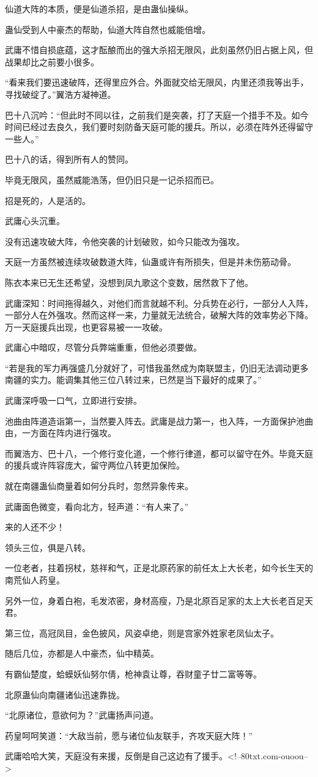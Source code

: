 \begin{this_body}
仙道大阵的本质，便是仙道杀招，是由蛊仙操纵。

蛊仙受到人中豪杰的帮助，仙道大阵自然也威能倍增。

武庸不惜自损底蕴，这才酝酿而出的强大杀招无限风，此刻虽然仍旧占据上风，但战果却比之前要小很多。

“看来我们要迅速破阵，还得里应外合。外面就交给无限风，内里还须我等出手，寻找破绽了。”翼浩方凝神道。

巴十八沉吟：“但此时不同以往，之前我们是突袭，打了天庭一个措手不及。如今时间已经过去良久，我们要时刻防备天庭可能的援兵。所以，必须在阵外还得留守一些人。”

巴十八的话，得到所有人的赞同。

毕竟无限风，虽然威能浩荡，但仍旧只是一记杀招而已。

招是死的，人是活的。

武庸心头沉重。

没有迅速攻破大阵，令他突袭的计划破败，如今只能改为强攻。

天庭一方虽然被连续攻破数道大阵，仙蛊或许有所损失，但是并未伤筋动骨。

陈衣本来已无生还希望，没想到凤九歌这个变数，居然救下了他。

武庸深知：时间拖得越久，对他们而言就越不利。分兵势在必行，一部分人入阵，一部分人在外强攻。然而这样一来，力量就无法统合，破解大阵的效率势必下降。万一天庭援兵出现，也更容易被一一攻破。

武庸心中暗叹，尽管分兵弊端重重，但他必须要做。

“若是我的军力再强盛几分就好了，可惜我虽然成为南联盟主，仍旧无法调动更多南疆的实力。能调集其他三位八转过来，已然是当下最好的成果了。”

武庸深呼吸一口气，立即进行安排。

池曲由阵道造诣第一，当然要入阵去。武庸是战力第一，也入阵，一方面保护池曲由，一方面在阵内进行强攻。

而翼浩方、巴十八，一个修行变化道，一个修行律道，都可以留守在外。毕竟天庭的援兵或许阵容庞大，留守两位八转更加保险。

就在南疆蛊仙商量着如何分兵时，忽然异象传来。

武庸面色微变，看向北方，轻声道：“有人来了。”

来的人还不少！

领头三位，俱是八转。

一位老者，拄着拐杖，慈祥和气，正是北原药家的前任太上大长老，如今长生天的南荒仙人药皇。

另外一位，身着白袍，毛发浓密，身材高瘦，乃是北原百足家的太上大长老百足天君。

第三位，高冠凤目，金色披风，风姿卓绝，则是宫家外姓家老凤仙太子。

随后几位，亦都是人中豪杰，仙中精英。

有霸仙楚度，蛤蟆妖仙努尔倩，枪神袁让尊，吞财童子廿二富等等。

北原蛊仙向南疆诸仙迅速靠拢。

“北原诸位，意欲何为？”武庸扬声问道。

药皇呵呵笑道：“大敌当前，愿与诸位仙友联手，齐攻天庭大阵！”

武庸哈哈大笑，天庭没有来援，反倒是自己这边有了援手。<!--80txt.com-ouoou-->

\end{this_body}

